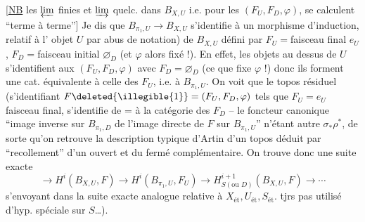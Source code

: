 [\uline{NB} les $\varprojlim$ finies et $\varinjlim$ quelc.
dans $B_{X,U}$ i.e. pour les $(F_U,F_D,\varphi)$, se
calculent ``terme à terme''] Je dis
que $B_{\pi_1,U}\longrightarrow B_{X,U}$ s'identifie à un
morphisme d'induction, relatif à l'
objet   $U$ par abus de notation)
de $B_{X,U}$ défini par
$F_U={}$faisceau final $e_U$, $F_D={}$faisceau initial $\varnothing_D$
(et $\varphi$  alors fixé !). En effet, les
objets  au dessus de $U$ s'identifient aux
$(F_U,F_D,\varphi)$ avec $F_D=\varnothing_D$ (ce que fixe $\varphi$ !) donc
ils forment une cat. équivalente à celle des
$F_U$, i.e. à $B_{\pi_1,U}$. On voit que le topos
résiduel (s'identifiant   $F\deleted{\illegible{1}}=(F_U,F_D,\varphi)$ tels
que $F_U=e_U$ faisceau final, s'identifie de = à la
catégorie  des $F_D$  -- le foncteur
canonique ``image inverse sur $B_{\pi_1,D}$ de l'image
directe de $F$ sur $B_{\pi_1,U}$'' n'étant autre
$\sigma_*\rho^*$, de sorte qu'on retrouve la description
 typique d'Artin d'un topos déduit
par ``recollement'' d'un  ouvert et du
fermé complémentaire.
On trouve donc une suite exacte
\[
\longrightarrow H^i(B_{X,U},F)\longrightarrow
H^i(B_{\pi_1,U},F_U)\longrightarrow
H^{i+1}_{S(\text{ou }D)}(B_{X,U},F)\longrightarrow\cdots
\]
s'envoyant dans la suite exacte analogue
relative à $X_{\mathrm{ét}},U_{\mathrm{ét}},S_{\mathrm{ét}}$.  
tjrs pas utilisé d'hyp. spéciale sur $S$\ldots).

